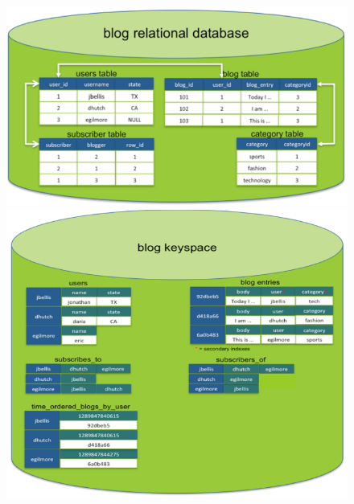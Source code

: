 \documentclass{article}
\begin{document}
\begin{figure}[!h]
  \centering
  \includegraphics[scale=0.25]{17}
  \includegraphics[scale=0.25]{18}
\end{figure}
\end{document}
